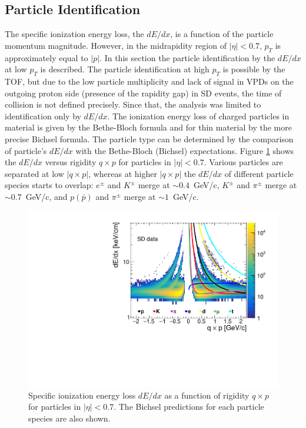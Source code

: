 \subsection{Particle Identification}\label{section:star_PIDdEdx}

The specific ionization energy loss, the $dE/dx$, is a function of the
particle momentum magnitude. However, in the midrapidity region of $|\eta| < 0.7$, $p_T$ is approximately equal to $|p|$. In this section the particle identification by the $dE/dx$ at low $p_T$ is described.
The particle identification at high $p_T$ is possible
by the TOF, but due to the low particle multiplicity and lack of signal in VPDs on the outgoing proton side (presence of the rapidity gap) in SD events, the time of collision is not defined precisely. Since that, the analysis was limited to identification only by $dE/dx$. \newline
The ionization energy loss of charged particles in material
is given by the Bethe-Bloch formula and for
thin material by the more precise Bichsel formula\cite{Bichsel:2006cs}.
The particle type can be determined by the comparison of particle's $dE/dx$ with the Bethe-Bloch (Bichsel) expectations.
Figure \ref{fig:star_dedx} shows the  $dE/dx$ versus rigidity $q\times p$ for particles in $|\eta| < 0.7$. Various particles are  separated at low $|q\times p|$, whereas at higher $|q\times p|$ the $dE/dx$ of different particle species starts to
overlap: $e^\pm$ and $K^\pm$ merge at $\sim0.4$~GeV/c, $K^\pm$ and
$\pi^\pm$ merge at $\sim0.7$~GeV/c, and $p(\bar{p})$ and $\pi^\pm$ merge
at $\sim1$~GeV/c. 
\begin{figure}[bh]
	\centering
	\includegraphics[width=0.8\linewidth, page=1]{chapters/chrgSTAR/img/dEdx/SDT_dEdx.pdf}
	\caption[Specific ionization
	energy loss $dE/dx$ as a function of rigidity $q\times p$ for particles
	in $|\eta| < 0.7$]{Specific ionization
		energy loss $dE/dx$ as a function of rigidity $q\times p$ for particles
		in $|\eta| < 0.7$. The Bichsel predictions for each particle species are also shown.}
	\label{fig:star_dedx}
\end{figure} 
